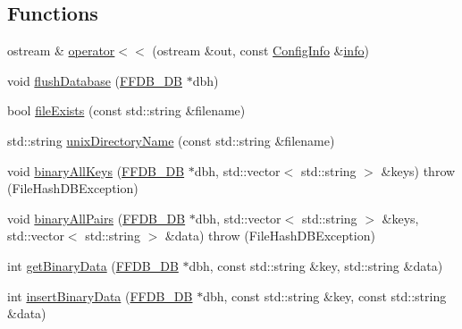 \subsection*{Functions}
\begin{DoxyCompactItemize}
\item 
ostream \& \mbox{\hyperlink{namespaceFILEDB_a81be1da26a44e7de301f9b93d784ce3f}{operator$<$$<$}} (ostream \&out, const \mbox{\hyperlink{classFILEDB_1_1ConfigInfo}{Config\+Info}} \&\mbox{\hyperlink{structinfo}{info}})
\item 
void \mbox{\hyperlink{namespaceFILEDB_a28e01191edebd63edee882e8c7af9325}{flush\+Database}} (\mbox{\hyperlink{adat-devel_2other__libs_2filedb_2filehash_2ffdb__db_8h_a0b27b956926453a7a8141ea8e10f0df8}{F\+F\+D\+B\+\_\+\+DB}} $\ast$dbh)
\item 
bool \mbox{\hyperlink{namespaceFILEDB_ae588550e41a7b104b78a0e81ceb24a46}{file\+Exists}} (const std\+::string \&filename)
\item 
std\+::string \mbox{\hyperlink{namespaceFILEDB_a7e76510d94991fb0a4e18acc02214900}{unix\+Directory\+Name}} (const std\+::string \&filename)
\item 
void \mbox{\hyperlink{namespaceFILEDB_a208d694e308a85bd3b04277ffe369377}{binary\+All\+Keys}} (\mbox{\hyperlink{adat-devel_2other__libs_2filedb_2filehash_2ffdb__db_8h_a0b27b956926453a7a8141ea8e10f0df8}{F\+F\+D\+B\+\_\+\+DB}} $\ast$dbh, std\+::vector$<$ std\+::string $>$ \&keys)  throw (\+File\+Hash\+D\+B\+Exception)
\item 
void \mbox{\hyperlink{namespaceFILEDB_ac242fd8f47258576482a692de8d1eaf3}{binary\+All\+Pairs}} (\mbox{\hyperlink{adat-devel_2other__libs_2filedb_2filehash_2ffdb__db_8h_a0b27b956926453a7a8141ea8e10f0df8}{F\+F\+D\+B\+\_\+\+DB}} $\ast$dbh, std\+::vector$<$ std\+::string $>$ \&keys, std\+::vector$<$ std\+::string $>$ \&data)  throw (\+File\+Hash\+D\+B\+Exception)
\item 
int \mbox{\hyperlink{namespaceFILEDB_a0de8699301294566d0e11786f4016a2a}{get\+Binary\+Data}} (\mbox{\hyperlink{adat-devel_2other__libs_2filedb_2filehash_2ffdb__db_8h_a0b27b956926453a7a8141ea8e10f0df8}{F\+F\+D\+B\+\_\+\+DB}} $\ast$dbh, const std\+::string \&key, std\+::string \&data)
\item 
int \mbox{\hyperlink{namespaceFILEDB_a517749615adc5aa798175fb429115366}{insert\+Binary\+Data}} (\mbox{\hyperlink{adat-devel_2other__libs_2filedb_2filehash_2ffdb__db_8h_a0b27b956926453a7a8141ea8e10f0df8}{F\+F\+D\+B\+\_\+\+DB}} $\ast$dbh, const std\+::string \&key, const std\+::string \&data)
\item 

\end{DoxyCompactItemize}
